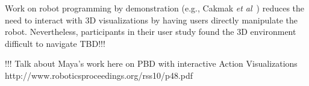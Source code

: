 \documentclass[10pt,twocolumn]{article}
\begin{document}
Work on robot programming by demonstration (e.g., Cakmak {\sl et al}~\cite{cakmak-rss10}) reduces the need to interact with 3D visualizations by having users directly manipulate the robot. Nevertheless, participants in their user study found the 3D environment difficult to navigate TBD!!!

!!! Talk about Maya's work here on PBD with interactive Action Visualizations
http://www.roboticsproceedings.org/rss10/p48.pdf

%
%
%
%
\end{document}
